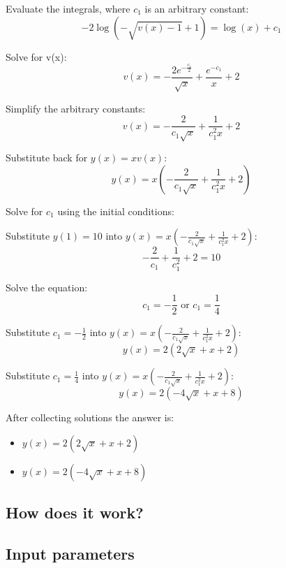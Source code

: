 \documentclass[12pt,letterpaper]{article}
\begin{document}
Evaluate the integrals, where $c_1$ is an arbitrary constant:
\begin{equation}
     -2\log (-\sqrt{v(x) - 1} + 1) = \log (x) + c_1
\end{equation}

Solve for v(x):
\begin{equation}
     v(x) = - \frac{2e^{-\frac{c_1}{2}}}{\sqrt{x}} + \frac{e^{-c_1}}{x} + 2
\end{equation}

Simplify the arbitrary constants:
\begin{equation}
     v(x) = - \frac{2}{c_1\sqrt{x}} + \frac{1}{c_1^2x} + 2
\end{equation}

Substitute back for $y(x) = x v(x)$:
\begin{equation}
     y(x) = x(- \frac{2}{c_1\sqrt{x}} + \frac{1}{c_1^2x} + 2)
\end{equation}

Solve for $c_1$ using the initial conditions:

Substitute $y(1) = 10$ into $y(x) = x(- \frac{2}{c_1\sqrt{x}} + \frac{1}{c_1^2x} + 2)$:
\begin{equation}
     -\frac{2}{c_1} + \frac{1}{c_1^2} + 2 = 10
\end{equation}

Solve the equation:
\begin{equation}
     c_1 = -\frac{1}{2} \text{ or } c_1 = \frac{1}{4}
\end{equation}

Substitute $c_1 = -\frac{1}{2}$ into $y(x) = x(- \frac{2}{c_1\sqrt{x}} + \frac{1}{c_1^2x} + 2)$:
\begin{equation}
     y(x) = 2 (2 \sqrt{x} + x + 2)
\end{equation}

Substitute $c_1 = \frac{1}{4}$ into $y(x) = x(- \frac{2}{c_1\sqrt{x}} + \frac{1}{c_1^2x} + 2)$:
\begin{equation}
     y(x) = 2 (-4 \sqrt{x} + x + 8)
\end{equation}

After collecting solutions the answer is:
\begin{itemize}
    \item
         $y(x) = 2 (2 \sqrt{x} + x + 2)$
    \item
         $y(x) = 2 (-4 \sqrt{x} + x + 8)$
\end{itemize}


\begin{center}
    \section*{How does it work?}
    \subsection*{Input parameters}
\end{center}
\end{document}
